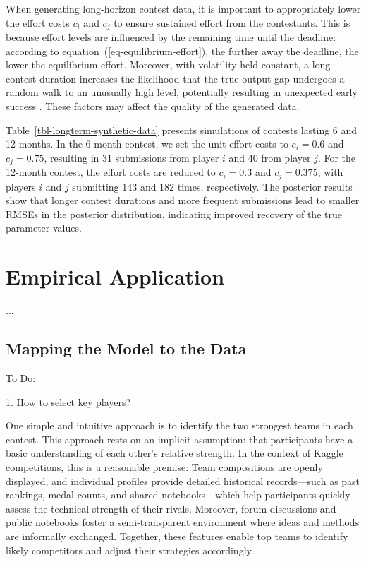 \documentclass[mnsc]{informs3}
\begin{document}
When generating long-horizon contest data, it is important to appropriately lower the effort costs $c_i$ and $c_j$ to ensure sustained effort from the contestants.
This is because effort levels are influenced by the remaining time until the deadline:
according to equation~(\ref{eq-equilibrium-effort}), the further away the deadline, the lower the equilibrium effort. 
Moreover, with volatility held constant, a long contest duration increases the likelihood that the true output gap undergoes a random walk to an unusually high level, potentially resulting in unexpected early success \citep{ryvkin2022fight}.
These factors may affect the quality of the generated data. 

Table~\ref{tbl-longterm-synthetic-data} presents simulations of contests lasting 6 and 12 months. 
In the 6-month contest, we set the unit effort costs to $c_i = 0.6$ and $c_j = 0.75$, resulting in 31 submissions from player $i$ and 40 from player $j$.
For the 12-month contest, the effort costs are reduced to $c_i = 0.3$ and $c_j = 0.375$, with players $i$ and $j$ submitting 143 and 182 times, respectively.
The posterior results show that longer contest durations and more frequent submissions lead to smaller RMSEs in the posterior distribution, indicating improved recovery of the true parameter values.




\section{Empirical Application}\label{sec-kaggle-application}

...

\subsection{Mapping the Model to the Data}

To Do:

1. How to select key players? 

One simple and intuitive approach is to identify the two strongest teams in each contest.
This approach rests on an implicit assumption: that participants have a basic understanding of each other’s relative strength. 
In the context of Kaggle competitions, this is a reasonable premise: 
Team compositions are openly displayed, and individual profiles provide detailed historical records—such as past rankings, medal counts, and shared notebooks—which help participants quickly assess the technical strength of their rivals. 
Moreover, forum discussions and public notebooks foster a semi-transparent environment where ideas and methods are informally exchanged. 
Together, these features enable top teams to identify likely competitors and adjust their strategies accordingly.
\end{document}
